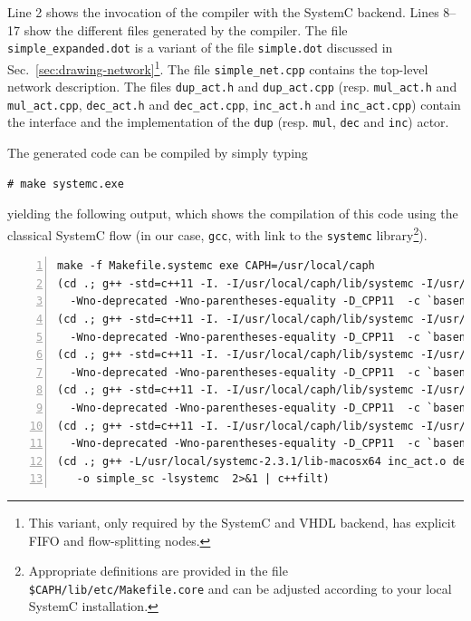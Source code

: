 Line 2 shows the invocation of the \caph compiler with the SystemC backend.
Lines 8--17 show the different files generated by the \caph compiler. The file
\verb|simple_expanded.dot| is a variant of the file \verb|simple.dot| discussed in
Sec.~\ref{sec:drawing-network}\footnote{This variant, only required by the SystemC and VHDL backend,
  has explicit FIFO and flow-splitting nodes.}.  The file \texttt{simple\_net.cpp} contains the
top-level network description. The files \verb|dup_act.h| and \verb|dup_act.cpp| (resp. \verb|mul_act.h| and
  \verb|mul_act.cpp|, \verb|dec_act.h| and \verb|dec_act.cpp|, \verb|inc_act.h| and \verb|inc_act.cpp|)
  contain the interface and the implementation of the \verb|dup| (resp. \texttt{mul},
  \texttt{dec} and \texttt{inc}) actor.

\medskip
The generated code can be compiled by simply typing 

\begin{lstlisting}[style=BashInputStyle]
# make systemc.exe
\end{lstlisting}

yielding the following output, which shows the compilation of this code using the classical SystemC
flow (in our case, \verb|gcc|, with link to the \verb|systemc| library\footnote{Appropriate
  definitions are provided in the file \texttt{\$CAPH/lib/etc/Makefile.core} and can be adjusted according to your
  local SystemC installation.}).

\begin{lstlisting}[style=BashOutputStyle,numbers=left,numberstyle=\tiny]
make -f Makefile.systemc exe CAPH=/usr/local/caph
(cd .; g++ -std=c++11 -I. -I/usr/local/caph/lib/systemc -I/usr/local/systemc-2.3.1/include
  -Wno-deprecated -Wno-parentheses-equality -D_CPP11  -c `basename inc_act.cpp`)
(cd .; g++ -std=c++11 -I. -I/usr/local/caph/lib/systemc -I/usr/local/systemc-2.3.1/include
  -Wno-deprecated -Wno-parentheses-equality -D_CPP11  -c `basename dec_act.cpp`)
(cd .; g++ -std=c++11 -I. -I/usr/local/caph/lib/systemc -I/usr/local/systemc-2.3.1/include 
  -Wno-deprecated -Wno-parentheses-equality -D_CPP11  -c `basename mul_act.cpp`)
(cd .; g++ -std=c++11 -I. -I/usr/local/caph/lib/systemc -I/usr/local/systemc-2.3.1/include 
  -Wno-deprecated -Wno-parentheses-equality -D_CPP11  -c `basename dup_act.cpp`)
(cd .; g++ -std=c++11 -I. -I/usr/local/caph/lib/systemc -I/usr/local/systemc-2.3.1/include 
  -Wno-deprecated -Wno-parentheses-equality -D_CPP11  -c `basename simple_net.cpp`)
(cd .; g++ -L/usr/local/systemc-2.3.1/lib-macosx64 inc_act.o dec_act.o mul_act.o dup_act.o simple_net.o
   -o simple_sc -lsystemc  2>&1 | c++filt)
\end{lstlisting}

